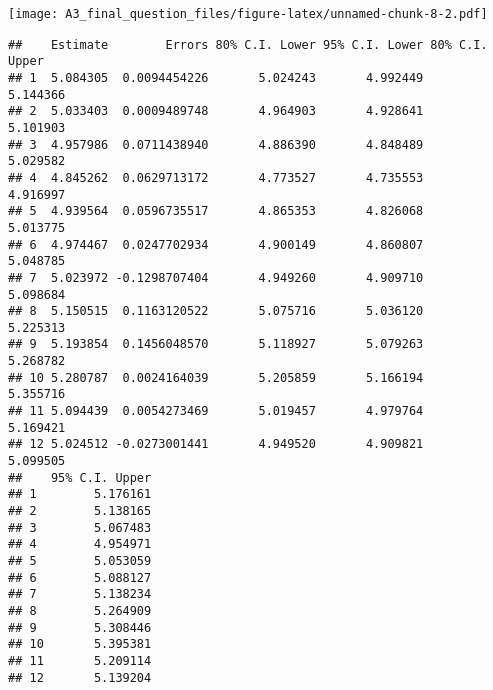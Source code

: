 \documentclass[]{article}
\newenvironment{Shaded}{\begin{snugshade}}{\end{snugshade}}
\newcommand{\CommentTok}[1]{\textcolor[rgb]{0.56,0.35,0.01}{\textit{#1}}}
\newcommand{\DecValTok}[1]{\textcolor[rgb]{0.00,0.00,0.81}{#1}}
\newcommand{\KeywordTok}[1]{\textcolor[rgb]{0.13,0.29,0.53}{\textbf{#1}}}
\newcommand{\NormalTok}[1]{#1}
\newcommand{\OperatorTok}[1]{\textcolor[rgb]{0.81,0.36,0.00}{\textbf{#1}}}
\newcommand{\StringTok}[1]{\textcolor[rgb]{0.31,0.60,0.02}{#1}}
\begin{document}
\texttt{[image: A3\_final\_question\_files/figure-latex/unnamed-chunk-8-2.pdf]}

\begin{Shaded}
\end{Shaded}

\begin{verbatim}
##    Estimate        Errors 80% C.I. Lower 95% C.I. Lower 80% C.I. Upper
## 1  5.084305  0.0094454226       5.024243       4.992449       5.144366
## 2  5.033403  0.0009489748       4.964903       4.928641       5.101903
## 3  4.957986  0.0711438940       4.886390       4.848489       5.029582
## 4  4.845262  0.0629713172       4.773527       4.735553       4.916997
## 5  4.939564  0.0596735517       4.865353       4.826068       5.013775
## 6  4.974467  0.0247702934       4.900149       4.860807       5.048785
## 7  5.023972 -0.1298707404       4.949260       4.909710       5.098684
## 8  5.150515  0.1163120522       5.075716       5.036120       5.225313
## 9  5.193854  0.1456048570       5.118927       5.079263       5.268782
## 10 5.280787  0.0024164039       5.205859       5.166194       5.355716
## 11 5.094439  0.0054273469       5.019457       4.979764       5.169421
## 12 5.024512 -0.0273001441       4.949520       4.909821       5.099505
##    95% C.I. Upper
## 1        5.176161
## 2        5.138165
## 3        5.067483
## 4        4.954971
## 5        5.053059
## 6        5.088127
## 7        5.138234
## 8        5.264909
## 9        5.308446
## 10       5.395381
## 11       5.209114
## 12       5.139204
\end{verbatim}
\end{document}
